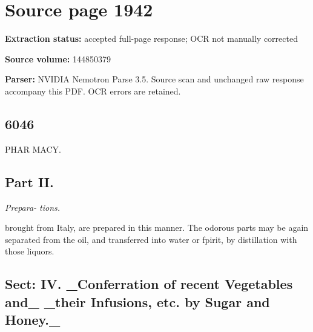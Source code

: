 \clearpage
\section{Source page 1942}
\textbf{Extraction status:} accepted full-page response; OCR not manually corrected\par
\textbf{Source volume:} 144850379\par
\textbf{Parser:} NVIDIA Nemotron Parse 3.5. Source scan and unchanged raw response accompany this PDF. OCR errors are retained.\par\medskip
\subsection*{6046}
PHAR MACY.\par\medskip
\subsection*{Part II.}
{\small\itshape Prepara-
tions.\par}\medskip
brought from Italy, are prepared in this manner. The
odorous parts may be again separated from the oil,
and transferred into water or fpirit, by distillation with
those liquors.\par\medskip
\subsection*{Sect: IV. \_Conferration of recent Vegetables and\_
\_their Infusions, etc. by Sugar and Honey.\_}
